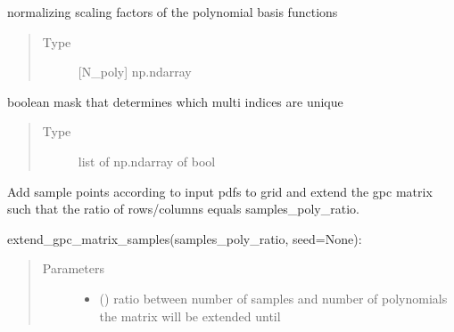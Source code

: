 \documentclass[letterpaper,10pt,english,openany,oneside]{sphinxmanual}
\begin{document}
\begin{fulllineitems}
\begin{fulllineitems}
\begin{quote}
\begin{description}
\end{description}\end{quote}

\end{fulllineitems}


\begin{fulllineitems}
\label{\detokenize{pygpc:pygpc.gpc.gPC.poly_norm_basis}}
normalizing scaling factors of the polynomial basis functions
\begin{quote}\begin{description}
\item[{Type}] \leavevmode
{[}N\_poly{]} np.ndarray

\end{description}\end{quote}

\end{fulllineitems}


\begin{fulllineitems}
\label{\detokenize{pygpc:pygpc.gpc.gPC.sobol_idx_bool}}
boolean mask that determines which multi indices are unique
\begin{quote}\begin{description}
\item[{Type}] \leavevmode
list of np.ndarray of bool

\end{description}\end{quote}

\end{fulllineitems}


\begin{fulllineitems}
\label{\detokenize{pygpc:pygpc.gpc.gPC.extend_gpc_matrix_samples}}
Add sample points according to input pdfs to grid and extend the gpc matrix such that the ratio of
rows/columns equals samples\_poly\_ratio.

extend\_gpc\_matrix\_samples(samples\_poly\_ratio, seed=None):
\begin{quote}\begin{description}
\item[{Parameters}] \leavevmode\begin{itemize}
\item {} 
 () \textendash{} ratio between number of samples and number of polynomials the matrix will be extended until


\end{itemize}
\end{description}
\end{quote}
\end{fulllineitems}
\end{fulllineitems}
\end{document}

